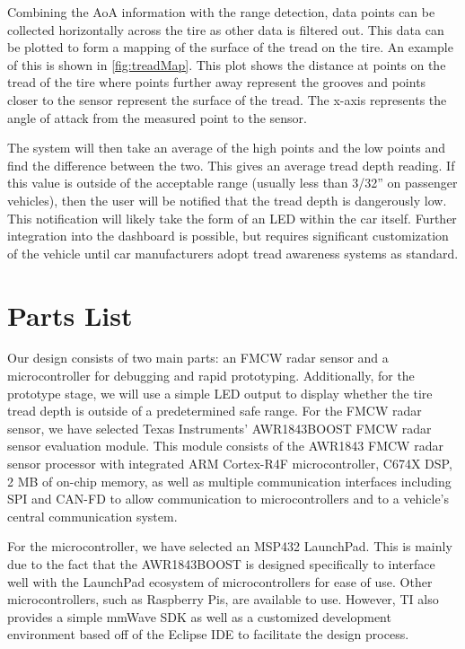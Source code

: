 \documentclass[11pt]{IEEEtran}
\begin{document}
		Combining the AoA information with the range detection, data points can be collected horizontally across the tire as other data is filtered out. This data can be plotted to form a mapping of the surface of the tread on the tire. An example of this is shown in \autoref{fig:treadMap}. This plot shows the distance at points on the tread of the tire where points further away represent the grooves and points closer to the sensor represent the surface of the tread. The x-axis represents the angle of attack from the measured point to the sensor. 

		The system will then take an average of the high points and the low points and find the difference between the two. This gives an average tread depth reading. If this value is outside of the acceptable range (usually less than 3/32'' on passenger vehicles), then the user will be notified that the tread depth is dangerously low. This notification will likely take the form of an LED within the car itself. Further integration into the dashboard is possible, but requires significant customization of the vehicle until car manufacturers adopt tread awareness systems as standard.


	\section{Parts List}
		Our design consists of two main parts: an FMCW radar sensor and a microcontroller for debugging and rapid prototyping. Additionally, for the prototype stage, we will use a simple LED output to display whether the tire tread depth is outside of a predetermined safe range. For the FMCW radar sensor, we have selected Texas Instruments' AWR1843BOOST FMCW radar sensor evaluation module. This module consists of the AWR1843 FMCW radar sensor processor with integrated ARM Cortex-R4F microcontroller, C674X DSP, 2 MB of on-chip memory, as well as multiple communication interfaces including SPI and CAN-FD to allow communication to microcontrollers and to a vehicle's central communication system.

		For the microcontroller, we have selected an MSP432 LaunchPad. This is mainly due to the fact that the AWR1843BOOST is designed specifically to interface well with the LaunchPad ecosystem of microcontrollers for ease of use. Other microcontrollers, such as Raspberry Pis, are available to use. However, TI also provides a simple mmWave SDK as well as a customized development environment based off of the Eclipse IDE to facilitate the design process. 
\end{document}
